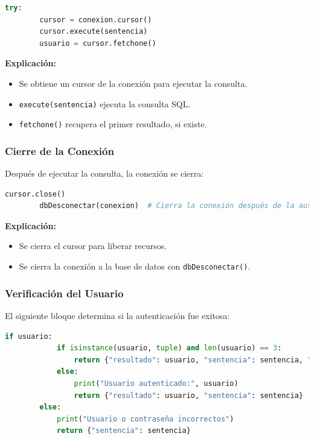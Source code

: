 \documentclass[a4paper,12pt]{article}
\begin{document}
\begin{lstlisting}[language=Python]
    try:
        cursor = conexion.cursor()
        cursor.execute(sentencia)
        usuario = cursor.fetchone()
\end{lstlisting}

\textbf{Explicación:}
\begin{itemize}
    \item Se obtiene un cursor de la conexión para ejecutar la consulta.
    \item \texttt{execute(sentencia)} ejecuta la consulta SQL.
    \item \texttt{fetchone()} recupera el primer resultado, si existe.
\end{itemize}

\subsubsection{Cierre de la Conexión}
Después de ejecutar la consulta, la conexión se cierra:

\begin{lstlisting}[language=Python]
        cursor.close()
        dbDesconectar(conexion)  # Cierra la conexión después de la autenticación
\end{lstlisting}

\textbf{Explicación:}
\begin{itemize}
    \item Se cierra el cursor para liberar recursos.
    \item Se cierra la conexión a la base de datos con \texttt{dbDesconectar()}.
\end{itemize}

\subsubsection{Verificación del Usuario}
El siguiente bloque determina si la autenticación fue exitosa:

\begin{lstlisting}[language=Python]
        if usuario:
            if isinstance(usuario, tuple) and len(usuario) == 3:
                return {"resultado": usuario, "sentencia": sentencia, "auth": "true"}
            else:
                print("Usuario autenticado:", usuario)
                return {"resultado": usuario, "sentencia": sentencia}
        else:
            print("Usuario o contraseña incorrectos")
            return {"sentencia": sentencia}
\end{lstlisting}
\end{document}
